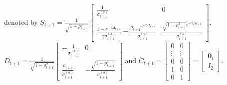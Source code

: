 denoted by $S_{t+1} = \frac{1}{\sqrt{ 1-\rho_{t+1}^2} } \begin{bmatrix}
\frac{1}{\sigma_{t+1}^{(x)}}& 0 \\
\frac{1-e^{-\gamma \Delta_{t+1}}}{\gamma \sigma_{t+1}^{(x)}}-\frac{\rho_{t+1} e^{-\gamma\Delta_{t+1}}}{\sigma_{t+1}^{(u)}} & \frac{\sqrt{1-\rho_{t+1}^2}e^{-\gamma\Delta_{t+1}}}{\sigma_{t+1}^{(u)}}
\end{bmatrix}$, $D_{t+1} =  \frac{1}{\sqrt{ 1-\rho_{t+1}^2} }\begin{bmatrix}
-\frac{1}{\sigma_{t+1}^{(x)}} & 0 \\
\frac{\rho_{t+1}}{\sigma_{t+1}^{(u)}} & -\frac{\sqrt{1-\rho_{t+1}^2}}{\sigma_{t+1}^{(u)}}
\end{bmatrix}$ and $C_{t+1} = \begin{bmatrix} 0 & 0 \\ \vdots & \vdots \\ 0 & 0 \\ 1 & 0 \\ 0 & 1 \end{bmatrix} = \begin{bmatrix}
\mathbf{0}_t \\ I_{2} \end{bmatrix}$. 


